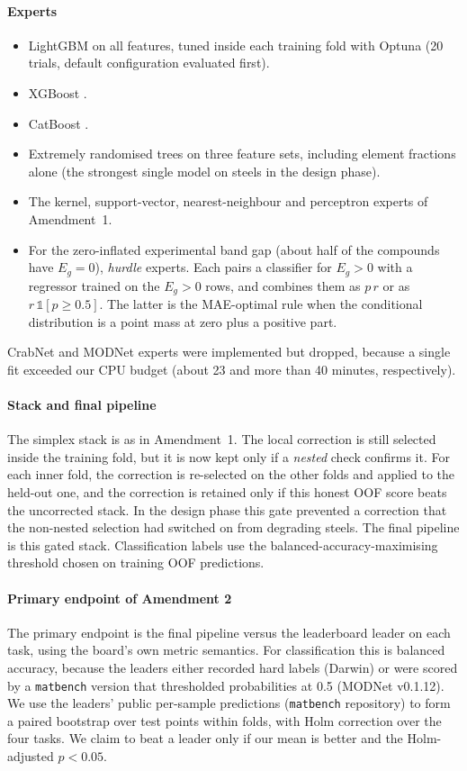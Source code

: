 \paragraph{Experts}
\begin{itemize}
\item LightGBM on all features, tuned inside each training fold with Optuna \citep{akiba2019optuna} (20 trials, default configuration evaluated first).
\item XGBoost \citep{chen2016xgboost}.
\item CatBoost \citep{prokhorenkova2018catboost}.
\item Extremely randomised trees on three feature sets, including element fractions alone (the strongest single model on steels in the design phase).
\item The kernel, support-vector, nearest-neighbour and perceptron experts of Amendment~1.
\item For the zero-inflated experimental band gap (about half of the compounds have $E_g=0$), \emph{hurdle} experts. Each pairs a classifier for $E_g>0$ with a regressor trained on the $E_g>0$ rows, and combines them as $p\,r$ or as $r\,\mathbb{1}[p\ge 0.5]$. The latter is the MAE-optimal rule when the conditional distribution is a point mass at zero plus a positive part.
\end{itemize}
CrabNet and MODNet experts were implemented but dropped, because a single fit exceeded our CPU budget (about 23 and more than 40 minutes, respectively).

\paragraph{Stack and final pipeline}
The simplex stack is as in Amendment~1.
The local correction is still selected inside the training fold, but it is now kept only if a \emph{nested} check confirms it.
For each inner fold, the correction is re-selected on the other folds and applied to the held-out one, and the correction is retained only if this honest OOF score beats the uncorrected stack.
In the design phase this gate prevented a correction that the non-nested selection had switched on from degrading steels.
The final pipeline is this gated stack.
Classification labels use the balanced-accuracy-maximising threshold chosen on training OOF predictions.

\paragraph{Primary endpoint of Amendment 2}
The primary endpoint is the final pipeline versus the leaderboard leader on each task, using the board's own metric semantics. For classification this is balanced accuracy, because the leaders either recorded hard labels (Darwin) or were scored by a \texttt{matbench} version that thresholded probabilities at 0.5 (MODNet v0.1.12).
We use the leaders' public per-sample predictions (\texttt{matbench} repository) to form a paired bootstrap over test points within folds, with Holm correction over the four tasks.
We claim to beat a leader only if our mean is better and the Holm-adjusted $p<0.05$.
